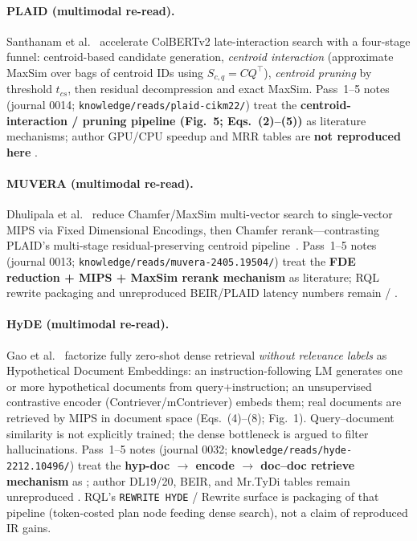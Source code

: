 \paragraph{PLAID (multimodal re-read).}
Santhanam et al.~\citep{santhanam2022plaid} accelerate ColBERTv2 late-interaction search with a four-stage funnel: centroid-based candidate generation, \emph{centroid interaction} (approximate MaxSim over bags of centroid IDs using $S_{c,q}=CQ^{\top}$), \emph{centroid pruning} by threshold $t_{cs}$, then residual decompression and exact MaxSim.
Pass~1--5 notes (journal 0014; \texttt{knowledge/reads/plaid-cikm22/}) treat the \textbf{centroid-interaction / pruning pipeline (Fig.~5; Eqs.~(2)--(5))} as \established{} literature mechanisms; author GPU/CPU speedup and MRR tables are \textbf{not reproduced here} \provisional{}.

\paragraph{MUVERA (multimodal re-read).}
Dhulipala et al.~\citep{jayaram2024muvera} reduce Chamfer/MaxSim multi-vector search to single-vector MIPS via Fixed Dimensional Encodings, then Chamfer rerank---contrasting PLAID's multi-stage residual-preserving centroid pipeline~\citep{santhanam2022plaid}.
Pass~1--5 notes (journal 0013; \texttt{knowledge/reads/muvera-2405.19504/}) treat the \textbf{FDE reduction + MIPS + MaxSim rerank mechanism} as \established{} literature; RQL rewrite packaging and unreproduced BEIR/PLAID latency numbers remain \hypothesis{} / \provisional{}.

\paragraph{HyDE (multimodal re-read).}
Gao et al.~\citep{gao2023hyde} factorize fully zero-shot dense retrieval \emph{without relevance labels} as Hypothetical Document Embeddings: an instruction-following LM generates one or more hypothetical documents from query+instruction; an unsupervised contrastive encoder (Contriever/mContriever) embeds them; real documents are retrieved by MIPS in document space (Eqs.~(4)--(8); Fig.~1).
Query--document similarity is not explicitly trained; the dense bottleneck is argued to filter hallucinations.
Pass~1--5 notes (journal 0032; \texttt{knowledge/reads/hyde-2212.10496/}) treat the \textbf{hyp-doc $\rightarrow$ encode $\rightarrow$ doc--doc retrieve mechanism} as \established{}; author DL19/20, BEIR, and Mr.TyDi tables remain unreproduced \provisional{}.
RQL's \texttt{REWRITE HYDE} / $\mathrm{Rewrite}$ surface is \hypothesis{} packaging of that pipeline (token-costed plan node feeding dense search), not a claim of reproduced IR gains.

